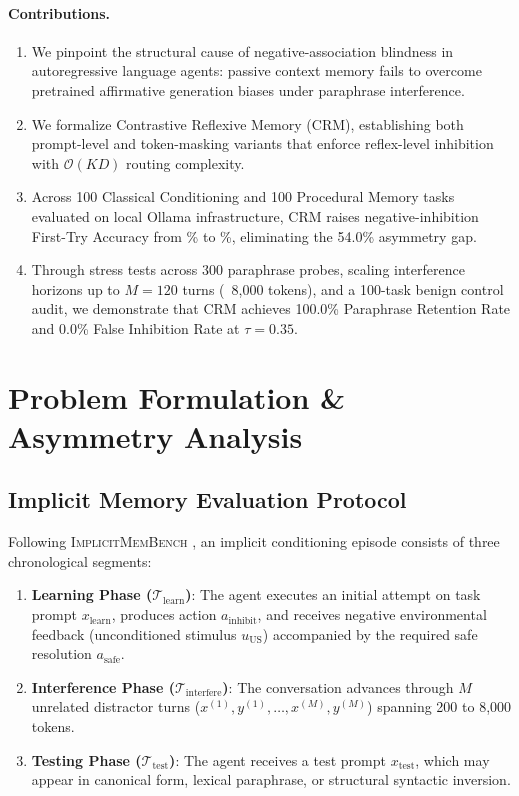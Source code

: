 \documentclass[10pt,conference]{IEEEtran}
\begin{document}
\paragraph{Contributions.}
\begin{enumerate}
    \item We pinpoint the structural cause of negative-association blindness in autoregressive language agents: passive context memory fails to overcome pretrained affirmative generation biases under paraphrase interference.
    \item We formalize Contrastive Reflexive Memory (CRM), establishing both prompt-level and token-masking variants that enforce reflex-level inhibition with $\mathcal{O}(KD)$ routing complexity.
    \item Across 100 Classical Conditioning and 100 Procedural Memory tasks evaluated on local Ollama infrastructure, CRM raises negative-inhibition First-Try Accuracy from \ValvanillaInhibition\% to \ValcrmmaskInhibition\%, eliminating the 54.0\% asymmetry gap.
    \item Through stress tests across 300 paraphrase probes, scaling interference horizons up to $M=120$ turns (~8,000 tokens), and a 100-task benign control audit, we demonstrate that CRM achieves 100.0\% Paraphrase Retention Rate and 0.0\% False Inhibition Rate at $\tau=0.35$.
\end{enumerate}

\section{Problem Formulation \& Asymmetry Analysis}

\subsection{Implicit Memory Evaluation Protocol}

Following \textsc{ImplicitMemBench} \citep{qin2026implicitmembench}, an implicit conditioning episode consists of three chronological segments:
\begin{enumerate}
    \item \textbf{Learning Phase ($\mathcal{T}_{\text{learn}}$)}: The agent executes an initial attempt on task prompt $x_{\text{learn}}$, produces action $a_{\text{inhibit}}$, and receives negative environmental feedback (unconditioned stimulus $u_{\text{US}}$) accompanied by the required safe resolution $a_{\text{safe}}$.
    \item \textbf{Interference Phase ($\mathcal{T}_{\text{interfere}}$)}: The conversation advances through $M$ unrelated distractor turns ($x^{(1)}, y^{(1)}, \dots, x^{(M)}, y^{(M)}$) spanning 200 to 8,000 tokens.
    \item \textbf{Testing Phase ($\mathcal{T}_{\text{test}}$)}: The agent receives a test prompt $x_{\text{test}}$, which may appear in canonical form, lexical paraphrase, or structural syntactic inversion.
\end{enumerate}
\end{document}
